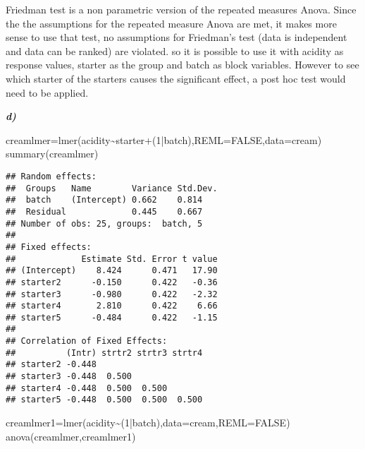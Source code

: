 \documentclass[
]{article}
\newenvironment{Shaded}{\begin{snugshade}}{\end{snugshade}}
\newcommand{\AttributeTok}[1]{\textcolor[rgb]{0.77,0.63,0.00}{#1}}
\newcommand{\ConstantTok}[1]{\textcolor[rgb]{0.00,0.00,0.00}{#1}}
\newcommand{\DecValTok}[1]{\textcolor[rgb]{0.00,0.00,0.81}{#1}}
\newcommand{\FunctionTok}[1]{\textcolor[rgb]{0.00,0.00,0.00}{#1}}
\newcommand{\NormalTok}[1]{#1}
\newcommand{\OtherTok}[1]{\textcolor[rgb]{0.56,0.35,0.01}{#1}}
\newcommand{\SpecialCharTok}[1]{\textcolor[rgb]{0.00,0.00,0.00}{#1}}
\begin{document}
Friedman test is a non parametric version of the repeated measures
Anova. Since the the assumptions for the repeated measure Anova are met,
it makes more sense to use that test, no assumptions for Friedman's test
(data is independent and data can be ranked) are violated. so it is
possible to use it with acidity as response values, starter as the group
and batch as block variables. However to see which starter of the
starters causes the significant effect, a post hoc test would need to be
applied.

\textbf{\emph{d)}}

\begin{Shaded}
\begin{Highlighting}[]
\NormalTok{creamlmer}\OtherTok{=}\FunctionTok{lmer}\NormalTok{(acidity}\SpecialCharTok{\textasciitilde{}}\NormalTok{starter}\SpecialCharTok{+}\NormalTok{(}\DecValTok{1}\SpecialCharTok{|}\NormalTok{batch),}\AttributeTok{REML=}\ConstantTok{FALSE}\NormalTok{,}\AttributeTok{data=}\NormalTok{cream)}
\FunctionTok{summary}\NormalTok{(creamlmer)}
\end{Highlighting}
\end{Shaded}

\begin{verbatim}
## Random effects:
##  Groups   Name        Variance Std.Dev.
##  batch    (Intercept) 0.662    0.814   
##  Residual             0.445    0.667   
## Number of obs: 25, groups:  batch, 5
## 
## Fixed effects:
##             Estimate Std. Error t value
## (Intercept)    8.424      0.471   17.90
## starter2      -0.150      0.422   -0.36
## starter3      -0.980      0.422   -2.32
## starter4       2.810      0.422    6.66
## starter5      -0.484      0.422   -1.15
## 
## Correlation of Fixed Effects:
##          (Intr) strtr2 strtr3 strtr4
## starter2 -0.448                     
## starter3 -0.448  0.500              
## starter4 -0.448  0.500  0.500       
## starter5 -0.448  0.500  0.500  0.500
\end{verbatim}

\begin{Shaded}
\begin{Highlighting}[]
\NormalTok{creamlmer1}\OtherTok{=}\FunctionTok{lmer}\NormalTok{(acidity}\SpecialCharTok{\textasciitilde{}}\NormalTok{(}\DecValTok{1}\SpecialCharTok{|}\NormalTok{batch),}\AttributeTok{data=}\NormalTok{cream,}\AttributeTok{REML=}\ConstantTok{FALSE}\NormalTok{)}
\FunctionTok{anova}\NormalTok{(creamlmer,creamlmer1)}
\end{Highlighting}
\end{Shaded}
\end{document}
